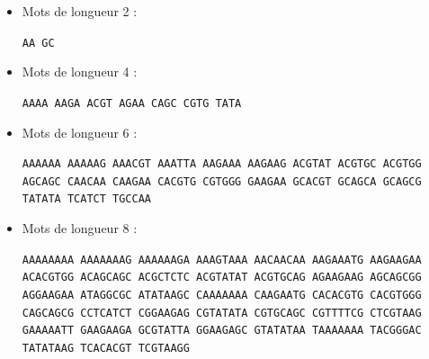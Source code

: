 \documentclass[a4paper,12pt]{article}
\begin{document}
\newpage

\begin{itemize}
\raggedright
\item Mots de longueur 2 :

\texttt{AA GC}

\item Mots de longueur 4 :

\texttt{AAAA AAGA ACGT AGAA CAGC CGTG TATA}

\item Mots de longueur 6 :

\texttt{AAAAAA AAAAAG AAACGT AAATTA AAGAAA AAGAAG ACGTAT ACGTGC ACGTGG AGCAGC CAACAA CAAGAA CACGTG CGTGGG GAAGAA GCACGT GCAGCA GCAGCG TATATA TCATCT TGCCAA}

\item Mots de longueur 8 :

\texttt{AAAAAAAA AAAAAAAG AAAAAAGA AAAGTAAA AACAACAA AAGAAATG AAGAAGAA ACACGTGG ACAGCAGC ACGCTCTC ACGTATAT ACGTGCAG AGAAGAAG AGCAGCGG AGGAAGAA ATAGGCGC ATATAAGC CAAAAAAA CAAGAATG CACACGTG CACGTGGG CAGCAGCG CCTCATCT CGGAAGAG CGTATATA CGTGCAGC CGTTTTCG CTCGTAAG GAAAAATT GAAGAAGA GCGTATTA GGAAGAGC GTATATAA TAAAAAAA TACGGGAC TATATAAG TCACACGT TCGTAAGG}
\end{itemize}
\end{document}
